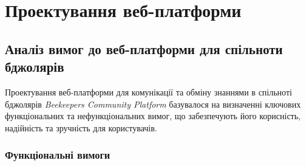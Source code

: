 \chapter{Проектування веб-платформи}
\label{ch:design}

\section{Аналіз вимог до веб-платформи для спільноти бджолярів}
\label{sec:requirements}
Проектування веб-платформи для комунікації та обміну знаннями в спільноті бджолярів \textit{Beekeepers Community Platform} базувалося на визначенні ключових функціональних та нефункціональних вимог, що забезпечують його корисність, надійність та зручність для користувачів.

\subsection{Функціональні вимоги}
